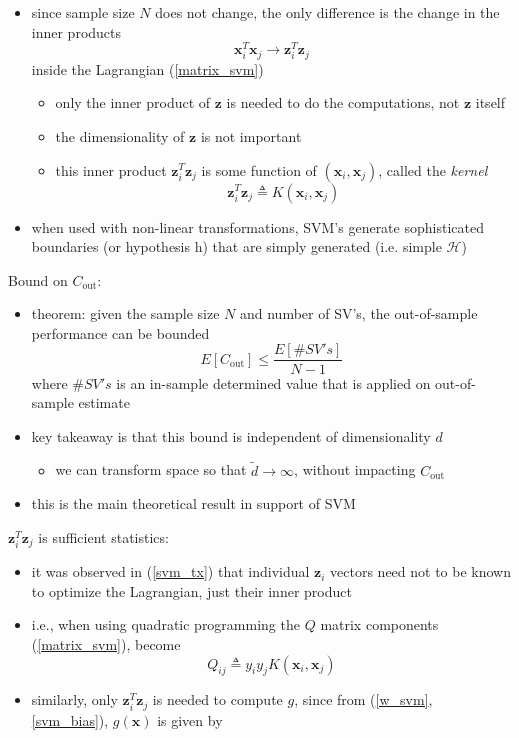 \documentclass[onecolumn]{IEEEtran}
\newcommand{\beq}{\begin{equation}}
\newcommand{\eeq}{\end{equation}}
\newcommand{\bi}{\begin{itemize}}
\newcommand{\ei}{\end{itemize}}
\begin{document}
\begin{itemize}
        \item since sample size $N$ does not change, the only difference is the change in the inner products
        \beq\label{svm_tx}
            \bm{x}_i^T \bm{x}_j \rightarrow \bm{z}_i^T \bm{z}_j
        \eeq
        inside the Lagrangian (\ref{matrix_svm})
        \bi
            \item only the inner product of $\bm{z}$ is needed to do the computations, not $\bm{z}$ itself
            \item the dimensionality of $\bm{z}$ is not important
            \item this inner product $\bm{z}_i^T \bm{z}_j$ is some function of $(\bm{x}_i, \bm{x}_j)$, called the \emph{kernel}
            \beq\boxed{
                \bm{z}_i^T \bm{z}_j \triangleq K(\bm{x}_i, \bm{x}_j)}
            \eeq
        \ei
        \item when used with non-linear transformations, SVM's generate sophisticated boundaries (or hypothesis h) that are simply generated (i.e. simple $\mathcal{H}$)
    \ei
    \item Bound on $C_\text{out}$:
    \bi
        \item theorem: given the sample size $N$ and number of SV's, the out-of-sample performance can be bounded
        \beq
            E[ C_\text{out}] \leq  \frac{E[\# SV's]}{N-1}
        \eeq
        where $\# SV's$ is an in-sample determined value that is applied on out-of-sample estimate
        \item key takeaway is that this bound is independent of dimensionality $d$
        \bi
            \item we can transform space so that $\tilde{d} \rightarrow \infty$, without impacting $C_\text{out}$
        \ei
        \item this is the main theoretical result in support of SVM
    \ei
    \item $\bm{z}_i^T \bm{z}_j$ is sufficient statistics:
    \bi
        \item it was observed in (\ref{svm_tx}) that individual $\bm{z}_i$ vectors need not to be known to optimize the Lagrangian, just their inner product
        \item i.e., when using quadratic programming the $Q$ matrix components (\ref{matrix_svm}), become
        \beq\label{matrix_k}
            Q_{ij} \triangleq  y_i y_j K(\bm{x}_i, \bm{x}_j)
        \eeq
        \item similarly, only $\bm{z}_i^T \bm{z}_j$ is needed to compute $g$, since from (\ref{w_svm}, \ref{svm_bias}), $g(\bm{x})$ is given by

\end{itemize}
\end{document}
